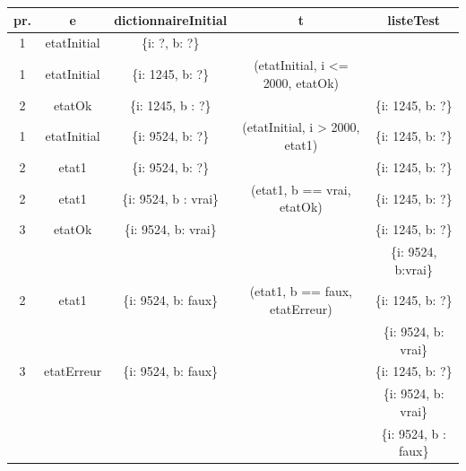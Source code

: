 \begin{table}[H]
 \centering
 \begin{tabular}{|c|c|c|c|c|}
  \hline
  \textbf{pr.} & \textbf{e} & \textbf{dictionnaireInitial} & \textbf{t} 
& \textbf{listeTest} \\
  \hline
  1 & etatInitial & \{i: ?, b: ?\} & & \\
  \hline
  1 & etatInitial & \{i: 1245, b: ?\} & (etatInitial, i <= 2000, etatOk) & \\
  \hline
  2 & etatOk & \{i: 1245, b : ?\} &  & \{i: 1245, b: ?\} \\
  \hline
  1 & etatInitial & \{i: 9524, b: ?\} & (etatInitial, i > 2000, etat1) &
  \{i: 1245, b: ?\}  \\
  \hline
  2 & etat1 & \{i: 9524, b: ?\} & & \{i: 1245, b: ?\} \\
  \hline
  2 & etat1 & \{i: 9524, b : vrai\} & (etat1, b == vrai, etatOk) & \{i: 1245, 
b: ?\} \\
  \hline
  3 & etatOk & \{i: 9524, b: vrai\} &  & \{i: 1245, b: ?\} \\ 
   & & & &\{i: 9524, b:vrai\} \\
  \hline
  2 & etat1 & \{i: 9524, b: faux\} & (etat1, b == faux, etatErreur) & \{i: 
1245, b: ?\}\\
   & & & &\{i: 9524, b: vrai\}\\
  \hline
  3 & etatErreur & \{i: 9524, b: faux\} & & \{i: 1245, b: ?\}\\
   & & & &\{i: 9524, b: vrai\}\\
   & & & &\{i: 9524, b : faux\} \\
\hline
 \end{tabular}

\end{table}

